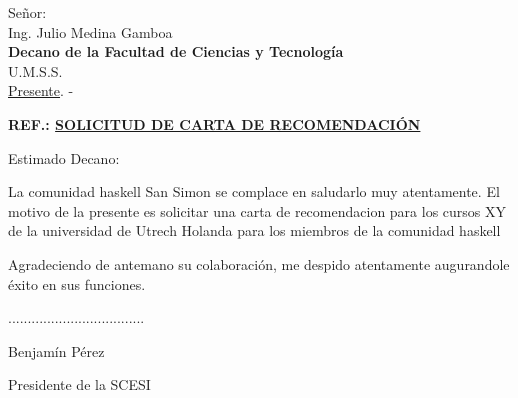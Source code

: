 \documentclass[a4paper,12pt]{letter}
\begin{document}
\begin{letter}{Se\~nor: \\ Ing. Julio Medina Gamboa \\ {\bfseries Decano de la Facultad de Ciencias y Tecnolog\'ia} \\ U.M.S.S. \\ \underline {Presente}. -}

\begin{center}
	\opening{\textbf{REF.: \underline{SOLICITUD DE CARTA DE RECOMENDACI\'ON}}}
\end{center}

Estimado Decano:

La comunidad haskell San Simon se complace en saludarlo muy atentamente.
El motivo de la presente es solicitar una carta de recomendacion para los cursos XY de la 
universidad de Utrech Holanda para los miembros de la comunidad haskell



Agradeciendo de antemano su colaboraci\'on, me despido atentamente augurandole \'exito en sus funciones.

\vspace{5cm}

\begin{center}
                \centerline{...................................}
                \centerline{Benjam\'in P\'erez}
                \centerline{Presidente de la SCESI}
\end{center}

\end{letter}
\end{document}
